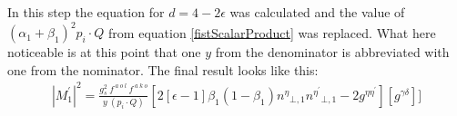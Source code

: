 %
%
In this step the equation for $ d = 4-2 \epsilon $ was calculated and the value of $ ({\alpha_1}+{\beta_1})^2 p_i \cdot Q $ from equation \eqref{fistScalarProduct} was replaced. What here noticeable is at this point that one $ y $ from the denominator is abbreviated with one from the nominator. The final result looks like this:
\begin{equation}
\begin{split}
{|{M}^{\prime}_1|}^2 =\frac{g_s^2 \:f^{\:a\:o\:l}\: f^{\:a\:k\:o}}{y\:(p_i\cdot Q)}[2[\epsilon-1]{\beta_1}(1-\beta_1){n^{{\eta}}}_{\bot,1}{n^{{\eta}^{\prime}}}_{\bot,1}-2g^{{\eta}{{\eta}^{\prime}}}][g^{{\gamma}{{\delta}}}]]
\end{split}
\end{equation}

\pagebreak

